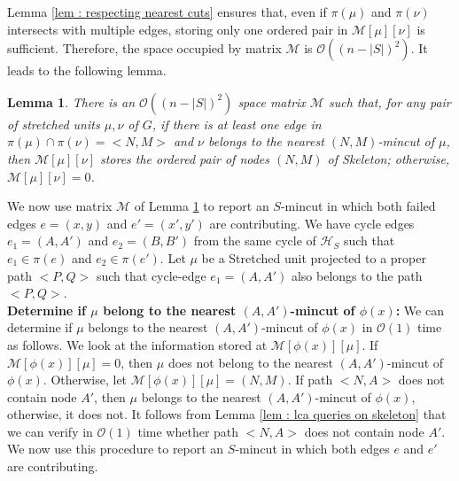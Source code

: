 \documentclass[letterpaper,11pt]{article}
\newtheorem{lemma}{Lemma}[]
\begin{document}
\noindent
Lemma \ref{lem : respecting nearest cuts} ensures that, even if $\pi(\mu)$ and $\pi(\nu)$ intersects with multiple edges, storing only one ordered pair in ${\mathcal M}[\mu][\nu]$ is sufficient.  Therefore, the space occupied by matrix ${\mathcal M}$ is ${\mathcal O}((n-|S|)^2)$. It leads to the following lemma.
\begin{lemma} \label{lem : matrix M}
    There is an ${\mathcal O}((n-|S|)^2)$ space matrix ${\mathcal M}$ such that, for any pair of stretched units $\mu,\nu$ of $G$, if there is at least one edge in $\pi(\mu) \cap \pi(\nu)=<N,M>$ and $\nu$ belongs to the nearest $(N,M)$-mincut of $\mu$, then ${\mathcal M}[\mu][\nu]$ stores the ordered pair of nodes $(N,M)$ of Skeleton; otherwise, ${\mathcal M}[\mu][\nu]=0$. 
\end{lemma}
We now use matrix ${\mathcal M}$ of Lemma \ref{lem : matrix M} to report an $S$-mincut in which both failed edges $e=(x,y)$ and $e'=(x',y')$ are contributing. We have cycle edges $e_1=(A,A')$ and $e_2=(B,B')$ from the same cycle of ${\mathcal H}_S$ such that $e_1\in \pi(e)$ and $e_2\in \pi(e')$. Let $\mu$ be a Stretched unit projected to a proper path $<P,Q>$ such that cycle-edge $e_1=(A,A')$ also belongs to the path $<P,Q>$. \\

\noindent
\textbf{Determine if $\mu$ belong to the nearest $(A,A')$-mincut of $\phi(x)$:} We can determine if $\mu$ belongs to the nearest $(A,A')$-mincut of $\phi(x)$ in ${\mathcal O}(1)$ time as follows. We look at the information stored at ${\mathcal M}[\phi(x)][\mu]$. If ${\mathcal M}[\phi(x)][\mu]=0$, then $\mu$ does not belong to the nearest $(A,A')$-mincut of $\phi(x)$. Otherwise, let ${\mathcal M}[\phi(x)][\mu]=(N,M)$. If path $<N,A>$ does not contain node $A'$, then $\mu$ belongs to the nearest $(A,A')$-mincut of $\phi(x)$, otherwise, it does not. It follows from Lemma \ref{lem : lca queries on skeleton} that we can verify in ${\mathcal O}(1)$ time whether path $<N,A>$ does not contain node $A'$. We now use this procedure to report an $S$-mincut in which both edges $e$ and $e'$ are contributing.\\
\end{document}
